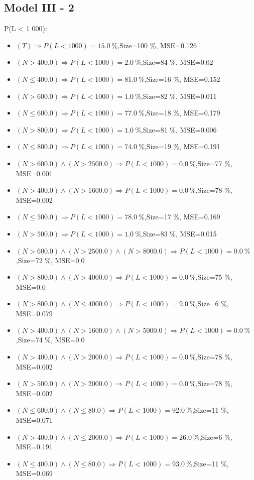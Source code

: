 \documentclass[numbered]{CSL}
\begin{document}
\subsection{Model III - 2}
P(L < 1 000):
\begin{itemize}
\item $(T) \Rightarrow P(L < 1 000) = 15.0~\%$,\hfill Size=100 \%, MSE=0.126
\item $(N > 400.0) \Rightarrow P(L < 1 000) = 2.0~\%$,\hfill Size=84 \%, MSE=0.02
\item $(N \leq 400.0) \Rightarrow P(L < 1 000) = 81.0~\%$,\hfill Size=16 \%, MSE=0.152
\item $(N > 600.0) \Rightarrow P(L < 1 000) = 1.0~\%$,\hfill Size=82 \%, MSE=0.011
\item $(N \leq 600.0) \Rightarrow P(L < 1 000) = 77.0~\%$,\hfill Size=18 \%, MSE=0.179
\item $(N > 800.0) \Rightarrow P(L < 1 000) = 1.0~\%$,\hfill Size=81 \%, MSE=0.006
\item $(N \leq 800.0) \Rightarrow P(L < 1 000) = 74.0~\%$,\hfill Size=19 \%, MSE=0.191
\item $(N > 600.0) \land (N > 2500.0) \Rightarrow P(L < 1 000) = 0.0~\%$,\hfill Size=77 \%, MSE=0.001
\item $(N > 400.0) \land (N > 1600.0) \Rightarrow P(L < 1 000) = 0.0~\%$,\hfill Size=78 \%, MSE=0.002
\item $(N \leq 500.0) \Rightarrow P(L < 1 000) = 78.0~\%$,\hfill Size=17 \%, MSE=0.169
\item $(N > 500.0) \Rightarrow P(L < 1 000) = 1.0~\%$,\hfill Size=83 \%, MSE=0.015
\item $(N > 600.0) \land (N > 2500.0) \land (N > 8000.0) \Rightarrow P(L < 1 000) = 0.0~\%$,\hfill Size=72 \%, MSE=0.0
\item $(N > 800.0) \land (N > 4000.0) \Rightarrow P(L < 1 000) = 0.0~\%$,\hfill Size=75 \%, MSE=0.0
\item $(N > 800.0) \land (N \leq 4000.0) \Rightarrow P(L < 1 000) = 9.0~\%$,\hfill Size=6 \%, MSE=0.079
\item $(N > 400.0) \land (N > 1600.0) \land (N > 5000.0) \Rightarrow P(L < 1 000) = 0.0~\%$,\hfill Size=74 \%, MSE=0.0
\item $(N > 400.0) \land (N > 2000.0) \Rightarrow P(L < 1 000) = 0.0~\%$,\hfill Size=78 \%, MSE=0.002
\item $(N > 500.0) \land (N > 2000.0) \Rightarrow P(L < 1 000) = 0.0~\%$,\hfill Size=78 \%, MSE=0.002
\item $(N \leq 600.0) \land (N \leq 80.0) \Rightarrow P(L < 1 000) = 92.0~\%$,\hfill Size=11 \%, MSE=0.071
\item $(N > 400.0) \land (N \leq 2000.0) \Rightarrow P(L < 1 000) = 26.0~\%$,\hfill Size=6 \%, MSE=0.191
\item $(N \leq 400.0) \land (N \leq 80.0) \Rightarrow P(L < 1 000) = 93.0~\%$,\hfill Size=11 \%, MSE=0.069
\end{itemize}
\end{document}
